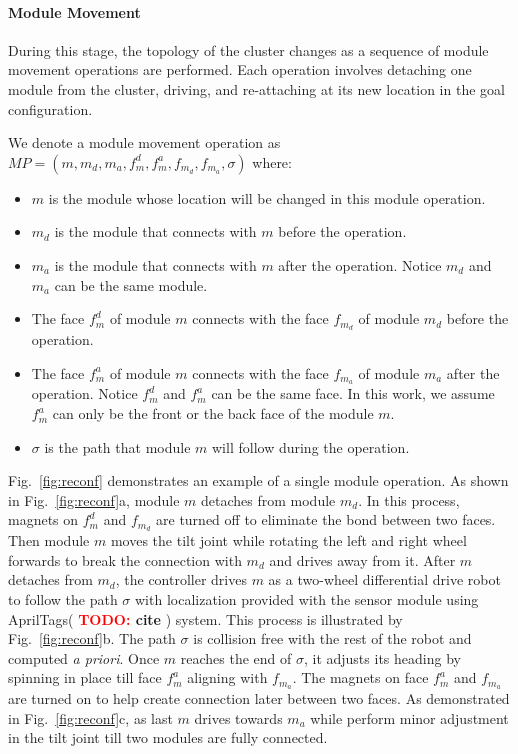 \documentclass[conference]{IEEEtran}
\newcommand{\TODO}[1]{ {\bf \textcolor{red}{TODO:} #1 }}
\begin{document}
\paragraph{Module Movement} During this stage, the topology of the cluster changes as a sequence of module movement operations are performed.  Each operation involves detaching one module from the cluster, driving, and re-attaching at its new location in the goal configuration.

We denote a module movement operation as $MP=\left(m, m_d, m_a, f_m^d, f_m^a, f_{m_d}, f_{m_a}, \sigma \right)$ where:
\begin{itemize}
\item $m$ is the module whose location will be changed in this module operation.
\item $m_d$ is the module that connects with $m$ before the operation.
\item $m_a$ is the module that connects with $m$ after the operation. Notice $m_d$ and $m_a$ can be the same module. 
\item The face $f_m^d$ of module $m$ connects with the face $f_{m_d}$ of module $m_d$ before the operation.
\item The face $f_m^a$ of module $m$ connects with the face $f_{m_a}$ of module $m_a$ after the operation. Notice $f_m^d$ and $f_m^a$ can be the same face. In this work, we assume $f_m^a$ can only be the front or the back face of the module $m$.
\item $\sigma$ is the path that module $m$ will follow during the operation.
\end{itemize}

Fig.~\ref{fig:reconf} demonstrates an example of a single module operation.
As shown in Fig.~\ref{fig:reconf}a, module $m$ detaches from module $m_d$.
In this process, magnets on $f_m^d$ and $f_{m_d}$ are turned off to eliminate the bond between two faces.
Then module $m$ moves the tilt joint while rotating the left and right wheel forwards to break the connection with $m_d$ and drives away from it.
After $m$ detaches from $m_d$, the controller drives $m$ as a two-wheel differential drive robot to follow the path $\sigma$ with localization provided with the sensor module using AprilTags(\TODO{cite}) system. This process is illustrated by Fig.~\ref{fig:reconf}b.
The path $\sigma$ is collision free with the rest of the robot and computed \textit{a priori}. 
Once $m$ reaches the end of $\sigma$, it adjusts its heading by spinning in place till face $f_m^a$ aligning with $f_{m_a}$.
The magnets on face $f_m^a$ and $f_{m_a}$ are turned on to help create connection later between two faces.
As demonstrated in Fig.~\ref{fig:reconf}c, as last $m$ drives towards $m_a$ while perform minor adjustment in the tilt joint till two modules are fully connected.
\end{document}
